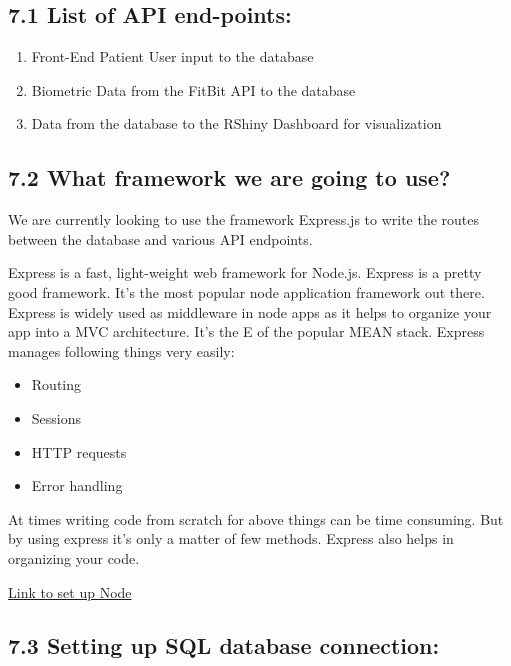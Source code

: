 \documentclass[]{book}
\providecommand{\tightlist}{%
  \setlength{\itemsep}{0pt}\setlength{\parskip}{0pt}}
\begin{document}
\hypertarget{list-of-api-end-points}{%
\subsection{7.1 List of API end-points:}\label{list-of-api-end-points}}

\begin{enumerate}
\def\labelenumi{\arabic{enumi}.}
\tightlist
\item
  Front-End Patient User input to the database
\item
  Biometric Data from the FitBit API to the database
\item
  Data from the database to the RShiny Dashboard for visualization
\end{enumerate}

\hypertarget{what-framework-we-are-going-to-use}{%
\subsection{7.2 What framework we are going to use?}\label{what-framework-we-are-going-to-use}}

We are currently looking to use the framework Express.js to write the routes between the database and various API endpoints.

Express is a fast, light-weight web framework for Node.js. Express is a pretty good framework. It's the most popular node application framework out there. Express is widely used as middleware in node apps as it helps to organize your app into a MVC architecture. It's the E of the popular MEAN stack. Express manages following things very easily:

\begin{itemize}
\tightlist
\item
  Routing
\item
  Sessions
\item
  HTTP requests
\item
  Error handling
\end{itemize}

At times writing code from scratch for above things can be time consuming. But by using express it's only a matter of few methods. Express also helps in organizing your code.

\href{https://medium.com/@onejohi/building-a-simple-rest-api-with-nodejs-and-express-da6273ed7ca9}{Link to set up Node}

\hypertarget{setting-up-sql-database-connection}{%
\subsection{7.3 Setting up SQL database connection:}\label{setting-up-sql-database-connection}}
\end{document}
